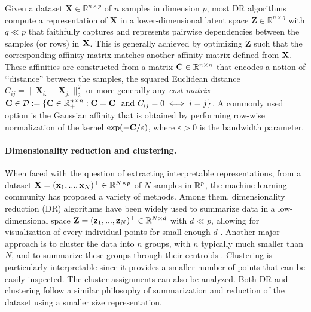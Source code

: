 Given a dataset $\mathbf{X} \in \mathbb{R}^{n \times p}$ of $n$ samples in dimension $p$, most DR algorithms compute a representation of $\mathbf{X}$ in a lower-dimensional latent space $\mathbf{Z} \in \mathbb{R}^{n \times q}$ with $q \ll p$ that faithfully captures and represents pairwise dependencies between the samples (or rows) in $\mathbf{X}$. This is generally achieved by optimizing $\mathbf{Z}$ such that the corresponding affinity matrix matches another affinity matrix defined from $\mathbf{X}$. These affinities are constructed from a matrix $\mathbf{C} \in \mathbb{R}^{n \times n}$ that encodes a notion of ‘‘distance'' between the samples, \eg the squared Euclidean distance $C_{ij} = \|\mathbf{X}_{i:}-\mathbf{X}_{j:}\|_2^2$ or more generally any \emph{cost matrix} $\mathbf{C} \in \mathcal{D} := \{\mathbf{C} \in \mathbb{R}_+^{n \times n} : \mathbf{C} = \mathbf{C}^\top \text{and } C_{ij}=0 \iff i=j\}$. A commonly used option is the Gaussian affinity that is obtained by performing row-wise normalization of the kernel $\exp(-\mathbf{C} / \varepsilon)$, where $\varepsilon >0$ is the bandwidth parameter.


\paragraph{Dimensionality reduction and clustering.}
When faced with the question of extracting
interpretable representations, from a dataset ${\mathbf{X}} = ({\mathbf{x}}_1, ..., {\mathbf{x}}_N) ^\top
\in \mathbb{R}^{N \times p}$ of $N$ samples in $\mathbb{R}^p$, the machine learning community
has proposed a variety of methods. Among them, dimensionality reduction (DR) algorithms have been widely used to summarize data in a low-dimensional space
${\mathbf{Z}} = ({\mathbf{z}}_1, ..., {\mathbf{z}}_N) ^\top \in \mathbb{R}^{N \times d}$ with $d \ll p$, allowing
for visualization of every individual points for small enough $d$ \citep{agrawal2021minimum,van2009dimensionality}.
Another major approach is to cluster the data into $n$ groups, with $n$
typically much smaller than $N$, and to summarize these groups through their centroids \citep{saxena2017review,ezugwu2022comprehensive}.
Clustering is particularly interpretable since it provides a
smaller number of points that can be easily inspected. %
The cluster assignments can also be analyzed. %
Both DR and clustering follow a
similar philosophy of summarization and reduction of the dataset using a smaller size representation.

